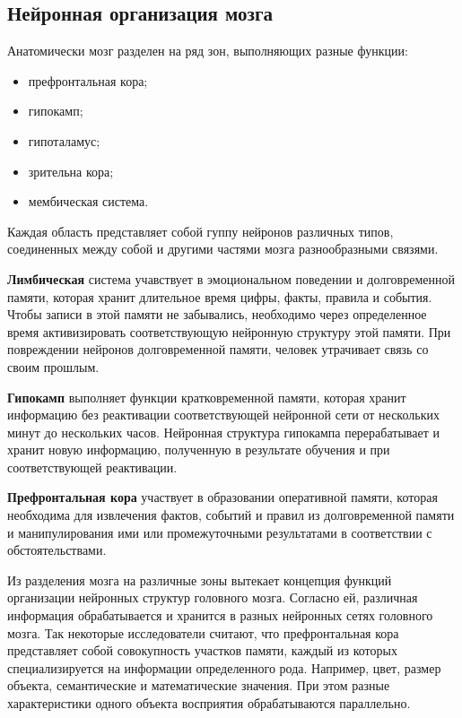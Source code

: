 \subsection{Нейронная организация мозга}
Анатомически мозг разделен на ряд зон, выполняющих разные функции:
\begin{itemize}
  \item префронтальная кора;
  \item гипокамп;
  \item гипоталамус;
  \item зрительна кора;
  \item мембическая система.
\end{itemize}
Каждая область представляет собой гуппу нейронов различных типов, соединенных
между собой и другими частями мозга разнообразными связями.\par
\textbf{Лимбическая} система учавствует в эмоциональном поведении и 
долговременной памяти, которая хранит длительное время цифры, факты, правила и
события. Чтобы записи в этой памяти не забывались, необходимо через 
определенное время активизировать соответствующую нейронную структуру этой 
памяти. При повреждении нейронов долговременной памяти, человек утрачивает 
связь со своим прошлым.\par
\textbf{Гипокамп} выполняет функции кратковременной памяти, которая хранит
информацию без реактивации соответствующей нейронной сети от нескольких минут до
нескольких часов. Нейронная структура гипокампа перерабатывает и хранит новую
информацию, полученную в результате обучения и при соответствующей
реактивации.\par
\textbf{Префронтальная кора} участвует в образовании оперативной памяти, которая
необходима для извлечения фактов, событий и правил из долговременной памяти и
манипулирования ими или промежуточными результатами в соответствии с
обстоятельствами.\par
Из разделения мозга на различные зоны вытекает концепция функций организации
нейронных структур головного мозга. Согласно ей, различная информация
обрабатывается и хранится в разных нейронных сетях головного мозга. Так
некоторые исследователи считают, что префронтальная кора представляет собой
совокупность участков памяти, каждый из которых специализируется на информации
определенного рода. Например, цвет, размер объекта, семантические и
математические значения. При этом разные характеристики одного объекта
восприятия обрабатываются параллельно.
